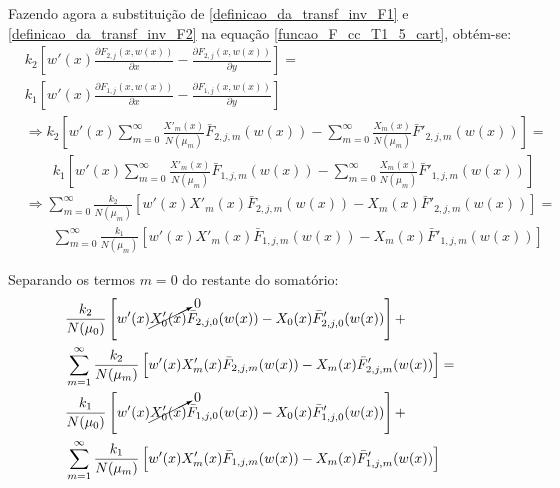 Fazendo agora a
substituição de \eqref{definicao_da_transf_inv_F1} e
\eqref{definicao_da_transf_inv_F2} na equação \eqref{funcao_F_cc_T1_5_cart}, obtém-se:
\begin{align}
	& k_2\left[w'(x)\frac{\partial F_{2,j}(x, w(x))}{\partial x} - \frac{\partial F_{2,j}(x, w(x))}{\partial y}\right] = \nonumber \\
	& k_1\left[w'(x)\frac{\partial F_{1,j}(x, w(x))}{\partial x} - \frac{\partial F_{1,j}(x, w(x))}{\partial y}\right] \nonumber \\
	& \Rightarrow k_2\left[w'(x)\sum_{m=0}^\infty \frac{X'_m(x)}{N(\mu_m)}\bar{F}_{2,j,m}(w(x)) - \sum_{m=0}^\infty \frac{X_m(x)}{N(\mu_m)}\bar{F}'_{2,j,m}(w(x)) \right] = \nonumber \\
	& \quad\quad k_1\left[w'(x)\sum_{m=0}^\infty \frac{X'_m(x)}{N(\mu_m)}\bar{F}_{1,j,m}(w(x)) - \sum_{m=0}^\infty \frac{X_m(x)}{N(\mu_m)}\bar{F}'_{1,j,m}(w(x)) \right] \nonumber \\
	& \Rightarrow  \sum_{m=0}^\infty \frac{k_2}{N(\mu_m)} \left[ w'(x) X'_m(x)\bar{F}_{2,j,m}(w(x)) - X_m(x)\bar{F}'_{2,j,m}(w(x)) \right] = \nonumber \\
	& \quad\quad \sum_{m=0}^\infty \frac{k_1}{N(\mu_m)} \left[ w'(x) X'_m(x)\bar{F}_{1,j,m}(w(x)) - X_m(x)\bar{F}'_{1,j,m}(w(x)) \right]
\end{align}

Separando os termos $m = 0$ do restante do somatório:
\begin{align}
& \frac{k_2}{N(\mu_0)} \left[ w'(x) \cancelto{0}{X'_0(x)}\bar{F}_{2,j,0}(w(x)) -  X_0(x)\bar{F}'_{2,j,0}(w(x)) \right] + \nonumber \\
& \sum_{m=1}^\infty \frac{k_2}{N(\mu_m)} \left[ w'(x) X'_m(x)\bar{F}_{2,j,m}(w(x)) - X_m(x)\bar{F}'_{2,j,m}(w(x)) \right] = \nonumber \\
& \frac{k_1}{N(\mu_0)} \left[w'(x) \cancelto{0}{X'_0(x)}\bar{F}_{1,j,0}(w(x)) - X_0(x)\bar{F}'_{1,j,0}(w(x)) \right] + \nonumber \\
& \sum_{m=1}^\infty \frac{k_1}{N(\mu_m)} \left[w'(x) X'_m(x)\bar{F}_{1,j,m}(w(x)) - X_m(x)\bar{F}'_{1,j,m}(w(x)) \right]
\end{align}

